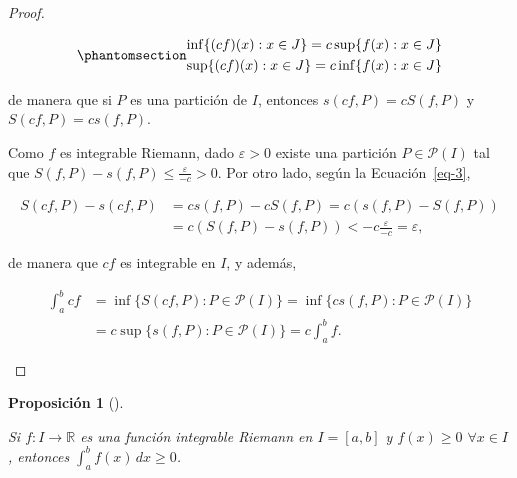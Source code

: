 \documentclass[
  a4paper,
]{scrreport}
\theoremstyle{definition}
\theoremstyle{plain}
\theoremstyle{definition}
\theoremstyle{definition}
\theoremstyle{plain}
\theoremstyle{plain}
\newtheorem{proposition}{Proposición}[chapter]
\theoremstyle{remark}
\begin{document}
\begin{tcolorbox}
\begin{proof}
\begin{enumerate}
  \begin{equation}\phantomsection\label{eq-3}{
  \begin{gathered}
  \inf\{(cf)(x): x\in J\} = c\sup\{f(x): x\in J\}\\
  \sup\{(cf)(x): x\in J\} = c\inf\{f(x): x\in J\}
  \end{gathered}
  }\end{equation}

  de manera que si \(P\) es una partición de \(I\), entonces
  \(s(cf,P)= cS(f,P)\) y \(S(cf,P) = cs(f,P)\).

  Como \(f\) es integrable Riemann, dado \(\varepsilon>0\) existe una
  partición \(P\in\mathcal{P}(I)\) tal que
  \(S(f,P)-s(f,P)\leq \frac{\varepsilon}{-c} >0\). Por otro lado, según
  la Ecuación~\ref{eq-3},

  \begin{align*}
  S(cf,P) - s(cf,P) &= c s(f,P) - cS(f,P) = c(s(f,P)-S(f,P)) \\
  &= c(S(f,P)-s(f,P)) < -c\frac{\varepsilon}{-c} = \varepsilon,
  \end{align*}

  de manera que \(cf\) es integrable en \(I\), y además,

  \begin{align*}
  \int_a^b cf &= \inf\{S(cf,P): P\in \mathcal{P}(I)\} = \inf\{cs(f,P): P\in \mathcal{P}(I)\} \\
  &= c\sup\{s(f,P): P\in \mathcal{P}(I)\} = c\int_a^b f.
  \end{align*}
\end{enumerate}

\end{proof}

\end{tcolorbox}

\begin{proposition}[]\protect\hypertarget{prp-integral-funcion-positiva}{}\label{prp-integral-funcion-positiva}

Si \(f:I\to\mathbb{R}\) es una función integrable Riemann en \(I=[a,b]\)
y \(f(x)\geq 0\) \(\forall x\in I\), entonces
\(\int_a^b f(x)\,dx \geq 0\).

\end{proposition}
\end{document}
